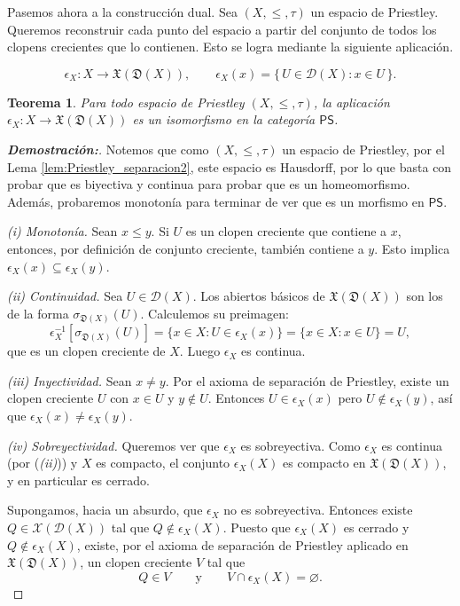 \documentclass[12pt]{book}
\newtheorem{theorem}{Teorema}[section]
\newcommand{\PS}{\mathsf{PS}}
\newcommand{\X}{\mathfrak{X}}
\newcommand{\D}{\mathfrak{D}}
\begin{document}
\medskip

Pasemos ahora a la construcción dual.  
Sea $(X,\leq,\tau)$ un espacio de Priestley. Queremos reconstruir cada punto del espacio
a partir del conjunto de todos los clopens crecientes que lo contienen. Esto se logra mediante la siguiente aplicación.

\[
\epsilon_{X}\colon X\longrightarrow \X(\D(X)),
\qquad
\epsilon_{X}(x)=\{\,U\in \mathcal{D}(X): x\in U\,\}.
\]

\begin{theorem}\label{thm:epsilon_iso}
Para todo espacio de Priestley $(X,\leq,\tau)$,  
la aplicación $\epsilon_{X}\colon X\to \X(\D(X))$ es un isomorfismo en la categoría $\mathsf{PS}$.
\end{theorem}

\begin{proof}[{\textbf{Demostración:}}]
Notemos que como $(X,\leq,\tau)$ un espacio de Priestley, por el Lema \ref{lem:Priestley_separacion2}, este espacio es Hausdorff, por lo que basta con probar que es biyectiva y continua para probar que es un homeomorfismo. Además, probaremos monotonía para terminar de ver que es un morfismo en $\PS$.

\smallskip
\noindent\emph{(i) Monotonía.}  
Sean $x\leq y$.  
Si $U$ es un clopen creciente que contiene a $x$, entonces, por definición de conjunto creciente, también contiene a $y$.  
Esto implica $\epsilon_{X}(x)\subseteq\epsilon_{X}(y)$.

\smallskip
\noindent\emph{(ii) Continuidad.}  
Sea $U\in \mathcal{D}(X)$.  
Los abiertos básicos de $\X(\D(X))$ son los de la forma $\sigma_{\D(X)}(U)$.  
Calculemos su preimagen:
\[
\epsilon_{X}^{-1}[\sigma_{\D(X)}(U)]
= \{x\in X : U\in\epsilon_{X}(x)\}
= \{x\in X : x\in U\}
= U,
\]
que es un clopen creciente de $X$.  
Luego $\epsilon_{X}$ es continua.

\smallskip
\noindent\emph{(iii) Inyectividad.}  
Sean $x\neq y$.  
Por el axioma de separación de Priestley, existe un clopen creciente $U$ con $x\in U$ y $y\notin U$.  
Entonces $U\in\epsilon_{X}(x)$ pero $U\notin\epsilon_{X}(y)$, así que $\epsilon_{X}(x)\neq\epsilon_{X}(y)$.

\smallskip

\noindent\emph{(iv) Sobreyectividad.}  
Queremos ver que $\epsilon_{X}$ es sobreyectiva.
Como $\epsilon_{X}$ es continua (por (\emph{(ii)})) y $X$ es compacto, el conjunto
$\epsilon_{X}(X)$ es compacto en $\X(\D(X))$, y en particular es cerrado.

Supongamos, hacia un absurdo, que $\epsilon_{X}$ no es sobreyectiva.  
Entonces existe $Q\in\mathcal{X}(\mathcal{D}(X))$ tal que $Q\notin\epsilon_{X}(X)$.
Puesto que $\epsilon_{X}(X)$ es cerrado y $Q\notin\epsilon_{X}(X)$, existe,
por el axioma de separación de Priestley aplicado en $\X(\D(X))$, un clopen
creciente $V$ tal que
\[
Q\in V
\qquad\text{y}\qquad
V\cap\epsilon_{X}(X)=\varnothing.
\]


\end{proof}
\end{document}
